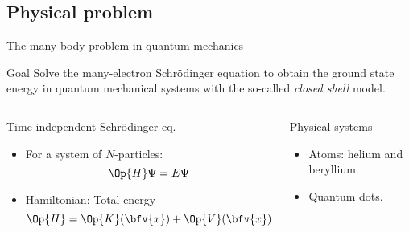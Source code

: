 \subsection{Physical problem}
\begin{frame}{The many-body problem in quantum mechanics}
	\begin{scriptsize}
		\begin{alertblock}{Goal}
			Solve the many-electron Schr\"odinger equation to obtain the ground state energy in quantum mechanical systems with the so-called \emph{closed shell} model.
		\end{alertblock}
	\end{scriptsize}
	

	\begin{columns}
		\column{5cm}
		\scriptsize
		\begin{block}{Time-independent Schr\"odinger eq.}
			\begin{itemize}
			\item For a system of $N$-particles:
			\begin{equation}
				\Op{H} \Psi = E \Psi
			\end{equation} 
			\item Hamiltonian: Total energy
			\begin{equation}\label{generalHamiltonian}
				\Op{H} = \Op{K}(\bfv{x}) + \Op{V}(\bfv{x})
			\end{equation}
			\end{itemize}
		\end{block}

		\column{5cm}
		\scriptsize
		\begin{block}{Physical systems}
			\begin{itemize}
			\item Atoms: helium and beryllium.
			\item Quantum dots.
			\end{itemize}
		\end{block}
	\end{columns}
\end{frame}



